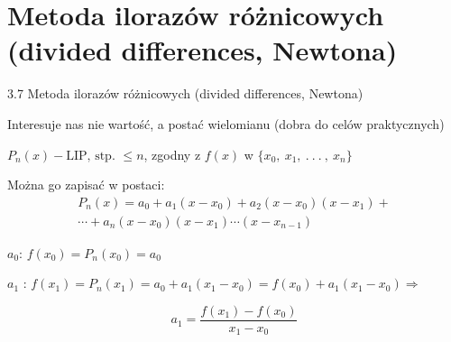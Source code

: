 \section{Metoda ilorazów różnicowych (divided differences, Newtona)}
\begin{frame}
{3.7 Metoda ilorazów różnicowych (divided differences, Newtona)}

Interesuje nas nie wartość, a  postać wielomianu (dobra do celów praktycznych)

$P_{n}(x)-\text{LIP, stp. } \leq n$, zgodny z $f(x)$ w $\{x_{0},\ x_{1},\ .\ .\ .\ ,\ x_{n}\}$

Można go zapisać w postaci:
\begin{equation*}\begin{split}
P_{n}(x)=a_{0}+a_{1}(x-x_{0})+a_{2}(x-x_{0})(x-x_{1})+ \\
\cdots+a_{n}(x-x_{0})(x-x_{1})\cdots(x-x_{n-1})
\end{split}
\end{equation*}

$a_{0}$: $f(x_{0})=P_{n}(x_{0})=a_{0}$

$a_{1}$ : $f(x_{1})=P_{n}(x_{1})=a_{0}+a_{1}(x_{1}-x_{0})=f(x_{0})+a_{1}(x_{1}-x_{0}) \Rightarrow$

$$
a_{1}=\frac{f(x_{1})-f(x_{0})}{x_{1}-x_{0}}
$$
\end{frame}

